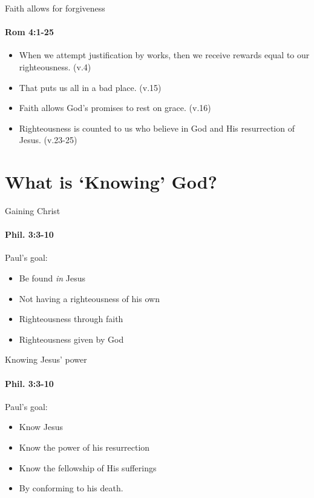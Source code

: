 \begin{frame}{Faith allows for forgiveness}
\framesubtitle{Rom 4:1-25}

\begin{itemize}
	\item When we attempt justification by works, then we receive rewards equal to our righteousness. (v.4)
	\item That puts us all in a bad place. (v.15)
	\item Faith allows God's promises to rest on grace. (v.16)
	\item Righteousness is counted to us who believe in God and His resurrection of Jesus. (v.23-25)
\end{itemize}

\end{frame}

\section{What is `Knowing' God?}

\begin{frame}{Gaining Christ}
\framesubtitle{Phil. 3:3-10}

Paul's goal:
\begin{itemize}
	\item Be found \emph{in} Jesus
	\item Not having a righteousness of his own 
	\item Righteousness through faith
	\item Righteousness given by God
\end{itemize}

\end{frame}

\begin{frame}{Knowing Jesus' power}
\framesubtitle{Phil. 3:3-10}

Paul's goal:
\begin{itemize}
	\item Know Jesus
	\item Know the power of his resurrection
	\item Know the fellowship of His sufferings
	\item By conforming to his death.
\end{itemize}

\end{frame}


